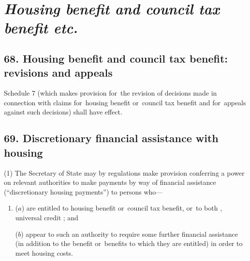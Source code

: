 \documentclass[12pt,a4paper]{article}
\begin{document}
\section{\itshape Housing benefit and council tax benefit etc.}

\subsection{68. Housing benefit and council tax benefit: revisions and appeals}

Schedule 7 (which makes provision for~the revision of decisions made in connection with claims for~housing benefit or~council tax benefit and for~appeals against such decisions) shall have effect.


\subsection{69. Discretionary financial assistance with housing}

(1) The Secretary of State may by regulations make provision conferring a power on 
relevant authorities 
to make payments by way of financial assistance (“discretionary housing payments”) to persons who—
\begin{enumerate}\item[]
($a$) are entitled to 
housing benefit or~council tax benefit, or~to both%
, universal credit%
; and

($b$) appear to such an authority to require some further financial assistance (in addition to the benefit or~benefits to which they are entitled) in order to meet housing costs.
\end{enumerate}
\end{document}
